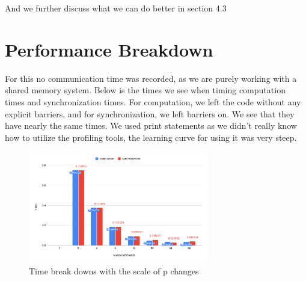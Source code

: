 \documentclass{article}
\begin{document}
And we further discuss what we can do better in section 4.3



\section{Performance Breakdown}
For this no communication time was recorded, as we are purely working with a shared memory system. Below is the times we see when timing computation times and synchronization times. For computation, we left the code without any explicit barriers, and for synchronization, we left barriers on. We see that they have nearly the same times. We used print statements as we didn't really know how to utilize the profiling tools, the learning curve for using it was very steep.

\begin{figure}[H] %
\centering %
\includegraphics[width=0.7\textwidth]{time_break_down.pdf} %
\caption{Time break downs with the scale of p changes} %
\label{Strong Scaling Efficiency VS Num of processors} %
\end{figure}











\end{document}
